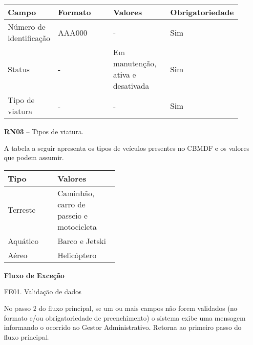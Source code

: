    \begin{table*}[!h]
    \centering
      \begin{tabular}{|p{0.20\linewidth}|p{0.25\linewidth}|p{0.25\linewidth}|p{0.25\linewidth}|}
      \hline
      Campo & Formato & Valores & Obrigatoriedade\\
    
  \hline                               
  Número de identificação & AAA000 & - & Sim\\

  \hline                               
  Status & - & Em manutenção, ativa e desativada & Sim\\
  
  \hline                               
  Tipo de viatura & - & - & Sim\\
  
  \hline     
        
      \end{tabular}
    \end{table*}
    
  \textbf{RN03} – Tipos de viatura.
   
 A tabela a seguir apresenta os tipos de veículos presentes no CBMDF e os valores que podem assumir.
 
   \begin{table*}[!h]
    \centering
      \begin{tabular}{|p{0.20\linewidth}|p{0.25\linewidth}|}
      \hline
      Tipo & Valores\\
    
  \hline                               
  Terreste & Caminhão, carro de passeio e motocicleta\\

  \hline                               
  Aquático & Barco e Jetski\\

  \hline                               
  Aéreo & Helicóptero\\
  
  \hline     
        
      \end{tabular}
    \end{table*}

      \vfill
  \pagebreak
    
   {\raggedright
      \textbf{Fluxo de Exceção}
   }
   
   FE01. Validação de dados

   No passo 2 do fluxo principal, se um ou mais campos não forem validados (no formato e/ou obrigatoriedade 
de preenchimento) o sistema exibe uma mensagem informando o ocorrido ao Gestor Administrativo. Retorna ao
primeiro passo do fluxo principal.

